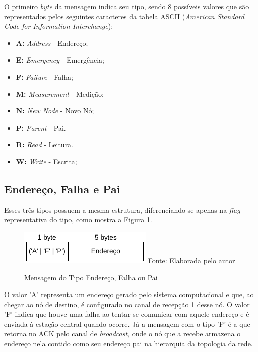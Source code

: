 {O primeiro \textit{byte} da mensagem indica seu tipo, sendo 8 possíveis valores que são representados pelos
seguintes caracteres da tabela ASCII (\textit{American Standard Code for Information Interchange}):

\begin{itemize}
	\item \textbf{A:} \textit{Address} - Endereço;
	\item \textbf{E:} \textit{Emergency} - Emergência;
	\item \textbf{F:} \textit{Failure} - Falha;
	\item \textbf{M:} \textit{Measurement} - Medição;
	\item \textbf{N:} \textit{New Node} - Novo Nó;
	\item \textbf{P:} \textit{Parent} - Pai.
	\item \textbf{R:} \textit{Read} - Leitura.
	\item \textbf{W:} \textit{Write} - Escrita;
\end{itemize}

\subsection{Endereço, Falha e Pai}
Esses três tipos possuem a mesma estrutura, diferenciando-se apenas na \textit{flag} representativa do tipo,
como mostra a Figura \ref{figura:message_addr_fail_parent}.

\begin{figure}[h!]
	\caption{Mensagem do Tipo Endereço, Falha ou Pai}
	\centering
	\includegraphics[scale=0.5]{../images/mensagem_end_falha_pai.png}
	\hspace{\linewidth}
	Fonte: Elaborada pelo autor
	\label{figura:message_addr_fail_parent}
\end{figure}

O valor 'A' representa um endereço gerado pelo sistema computacional e que, ao chegar ao nó de destino, é
configurado no canal de recepção 1 desse nó. O valor 'F' indica que houve uma falha ao tentar se comunicar com
aquele endereço e  é enviada à estação central quando ocorre. Já a mensagem com o tipo 'P' é a que retorna no
ACK pelo canal de \textit{broadcast}, onde o nó que a recebe armazena o endereço nela contido como seu
endereço pai na hierarquia da topologia da rede.

}
